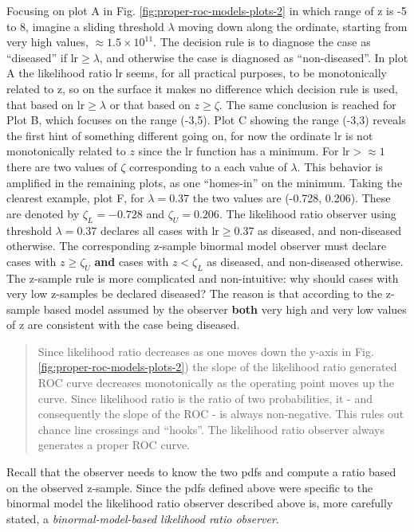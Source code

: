 \documentclass[
]{book}
\begin{document}
Focusing on plot A in Fig. \ref{fig:proper-roc-models-plots-2} in which range of z is -5 to 8, imagine a sliding threshold \(\lambda\) moving down along the ordinate, starting from very high values, \(\approx 1.5 \times 10^{11}\). The decision rule is to diagnose the case as ``diseased'' if \(\text{lr} \ge \lambda\), and otherwise the case is diagnosed as ``non-diseased''. In plot A the likelihood ratio \(\text{lr}\) seems, for all practical purposes, to be monotonically related to z, so on the surface it makes no difference which decision rule is used, that based on \(\text{lr} \ge \lambda\) or that based on \(z \ge \zeta\). The same conclusion is reached for Plot B, which focuses on the range (-3,5). Plot C showing the range (-3,3) reveals the first hint of something different going on, for now the ordinate \(\text{lr}\) is not monotonically related to \(z\) since the \(\text{lr}\) function has a minimum. For \(\text{lr} > \approx 1\) there are two values of \(\zeta\) corresponding to a each value of \(\lambda\). This behavior is amplified in the remaining plots, as one ``homes-in'' on the minimum. Taking the clearest example, plot F, for \(\lambda = 0.37\) the two values are (-0.728, 0.206). These are denoted by \(\zeta_L=-0.728\) and \(\zeta_U=0.206\). The likelihood ratio observer using threshold \(\lambda=0.37\) declares all cases with \(\text{lr} \ge 0.37\) as diseased, and non-diseased otherwise. The corresponding z-sample binormal model observer must declare cases with \(z \ge \zeta_U\) \textbf{and} cases with \(z < \zeta_L\) as diseased, and non-diseased otherwise. The z-sample rule is more complicated and non-intuitive: why should cases with very low z-samples be declared diseased? The reason is that according to the z-sample based model assumed by the observer \textbf{both} very high and very low values of z are consistent with the case being diseased.

\begin{quote}
Since likelihood ratio decreases as one moves down the y-axis in Fig. \ref{fig:proper-roc-models-plots-2}) the slope of the likelihood ratio generated ROC curve decreases monotonically as the operating point moves up the curve. Since likelihood ratio is the ratio of two probabilities, it - and consequently the slope of the ROC - is always non-negative. This rules out chance line crossings and ``hooks''. The likelihood ratio observer always generates a proper ROC curve.
\end{quote}

Recall that the observer needs to know the two pdfs and compute a ratio based on the observed z-sample. Since the pdfs defined above were specific to the binormal model the likelihood ratio observer described above is, more carefully stated, a \emph{binormal-model-based likelihood ratio observer}.
\end{document}
